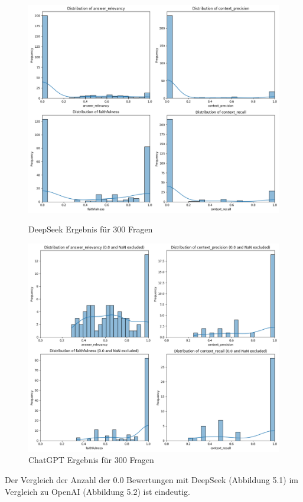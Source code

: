 \begin{figure}[htbp]
    \centering
    \begin{minipage}[b]{0.48\textwidth}
        \centering
        \includegraphics[width=\textwidth]{images/3_3_code_invest_D_D.png}
        \caption{DeepSeek Ergebnis für 300 Fragen}
        \label{fig:deepseek}
    \end{minipage}
    \hfill
    \begin{minipage}[b]{0.48\textwidth}
        \centering
        \includegraphics[width=\textwidth]{images/127_44_code_invest_O_O.png}
        \caption{ChatGPT Ergebnis für 300 Fragen}
        \label{fig:chatgpt}
    \end{minipage}
\end{figure}
Der Vergleich der Anzahl der 0.0 Bewertungen mit DeepSeek (Abbildung 5.1) im Vergleich zu OpenAI (Abbildung 5.2) ist eindeutig.\\


